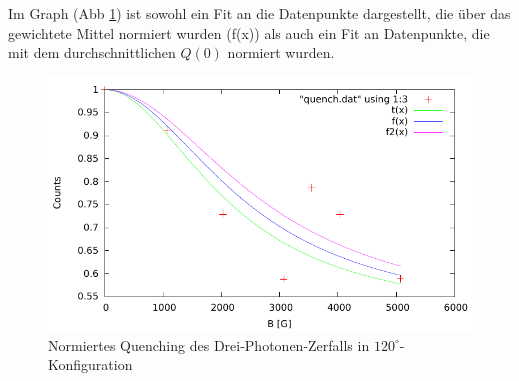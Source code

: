 Im Graph (Abb \ref{auswertung-quench-normiert}) ist sowohl ein Fit an die Datenpunkte dargestellt, die über das gewichtete Mittel normiert wurden (f(x)) als auch ein Fit an Datenpunkte, die mit dem durchschnittlichen $Q(0)$ normiert wurden. 



\begin{figure}
 \includegraphics[width=\textwidth]{Auswertung/quench-normiert.pdf}
 \caption{Normiertes Quenching des Drei-Photonen-Zerfalls in $120^\circ$-Konfiguration}
 \label{auswertung-quench-normiert}
\end{figure}
